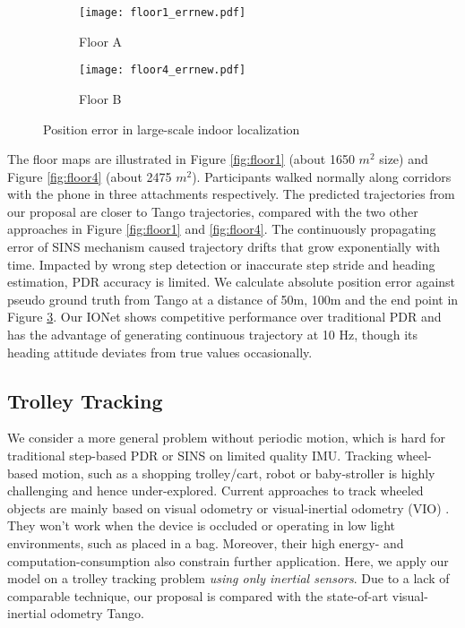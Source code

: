 \documentclass[letterpaper]{article}
\begin{document}
 	\begin{figure}
    	\centering
        \begin{subfigure}[t]{0.23\textwidth}
        	\texttt{[image: floor1\_errnew.pdf]}
        	\caption{\label{fig:floor1_err} Floor A}
        \end{subfigure}
        \begin{subfigure}[t]{0.23\textwidth}
        	\texttt{[image: floor4\_errnew.pdf]}
        	\caption{\label{fig:floor4_err} Floor B}
        \end{subfigure}
        \caption{\label{fig:large_error} Position error in large-scale indoor localization}
    \end{figure}

    The floor maps are illustrated in Figure \ref{fig:floor1} (about 1650 $m^2$ size) and Figure \ref{fig:floor4} (about 2475 $m^2$). Participants walked normally along corridors with the phone in three attachments respectively. The predicted trajectories from our proposal are closer to Tango trajectories, compared with the two other approaches in Figure \ref{fig:floor1} and \ref{fig:floor4}. The continuously propagating error of SINS mechanism caused trajectory drifts that grow exponentially with time. Impacted by wrong step detection or inaccurate step stride and heading estimation, PDR accuracy is limited. We calculate absolute position error against pseudo ground truth from Tango at a distance of 50m, 100m and the end point in Figure \ref{fig:large_error}. Our IONet shows competitive performance over traditional PDR and has the advantage of generating continuous trajectory at 10 Hz, though its heading attitude deviates from true values occasionally.

\subsection{Trolley Tracking}
	
    We consider a more general problem without periodic motion, which is hard for traditional step-based PDR or SINS on limited quality IMU. Tracking wheel-based motion, such as a shopping trolley/cart, robot or baby-stroller is highly challenging and hence under-explored. Current approaches to track wheeled objects are mainly based on visual odometry or visual-inertial odometry (VIO) \cite{Li2013b,Bloesch2015}. They won't work when the device is occluded or operating in low light environments, such as placed in a bag. Moreover, their high energy- and computation-consumption also constrain further application. Here, we apply our model on a trolley tracking problem \textit{using only inertial sensors}. Due to a lack of comparable technique, our proposal is compared with the state-of-art visual-inertial odometry Tango.
    
\end{document}
